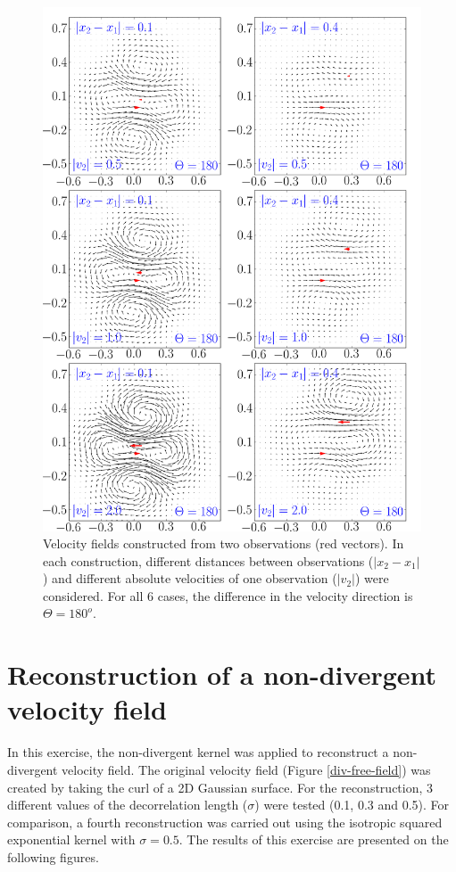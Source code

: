 \documentclass[12pt,a4paper]{article}%
\begin{document}
\begin{figure}
\centering\includegraphics[width=36pc]{plots/2_vectors_angle_180.png}
\caption{Velocity fields constructed from two observations (red vectors). 
In each construction,  different distances between observations ($|x_2 - x_1|$) 
and different absolute velocities of one observation ($|v_2|$) were considered. 
For all 6 cases, the difference in the velocity direction is $\Theta=180^o$. }
\label{2-vec-180}
\end{figure}

\newpage
\section{Reconstruction of a non-divergent velocity field}

In this exercise, the non-divergent kernel was applied to reconstruct 
a non-divergent velocity field. The original velocity field (Figure \ref{div-free-field}) 
was created by taking the curl of a 2D Gaussian surface. For the reconstruction, 3 
different values of the decorrelation length ($\sigma$) were tested (0.1, 0.3 and 0.5). 
For comparison, a fourth reconstruction was carried out using the isotropic squared 
exponential kernel with $\sigma = 0.5$. The results of this exercise are presented on the 
following figures.
\end{document}
